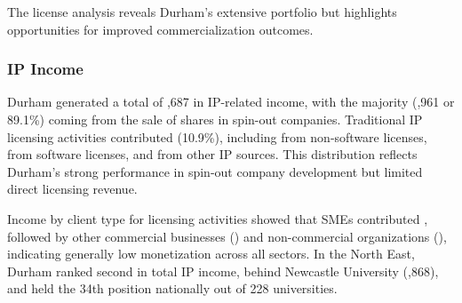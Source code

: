 \documentclass[journal,onecolumn, 10pt,draftclsnofoot]{IEEEtran}
\begin{document}
The license analysis reveals Durham's extensive portfolio but highlights opportunities for improved commercialization outcomes.

\subsubsection{IP Income}

Durham generated a total of ,687 in IP-related income, with the majority (,961 or 89.1\%) coming from the sale of shares in spin-out companies. Traditional IP licensing activities contributed  (10.9\%), including  from non-software licenses,  from software licenses, and  from other IP sources. This distribution reflects Durham's strong performance in spin-out company development but limited direct licensing revenue.

Income by client type for licensing activities showed that SMEs contributed , followed by other commercial businesses () and non-commercial organizations (), indicating generally low monetization across all sectors. In the North East, Durham ranked second in total IP income, behind Newcastle University (,868), and held the 34th position nationally out of 228 universities.
\end{document}
